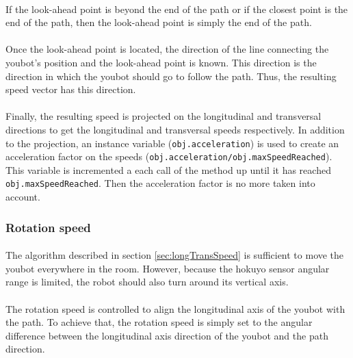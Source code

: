 \documentclass[12pt,a4paper]{article}
\begin{document}
\paragraph{} If the look-ahead point is beyond the end of the path or if the closest point is the end of the path, then the look-ahead point is simply the end of the path.

\paragraph{} Once the look-ahead point is located, the direction of the line connecting the youbot's position and the look-ahead point is known. This direction is the direction in which the youbot should go to follow the path. Thus, the resulting speed vector has this direction.

\paragraph{} Finally, the resulting speed is projected on the longitudinal and transversal directions to get the longitudinal and transversal speeds respectively. In addition to the projection, an instance variable (\texttt{obj.acceleration}) is used to create an acceleration factor on the speeds (\texttt{obj.acceleration/obj.maxSpeedReached}). This variable is incremented a each call of the method up until it has reached \texttt{obj.maxSpeedReached}. Then the acceleration factor is no more taken into account.

\subsubsection{Rotation speed}
\paragraph{} The algorithm described in section \ref{sec:longTransSpeed} is sufficient to move the youbot everywhere in the room. However, because the hokuyo sensor angular range is limited, the robot should also turn around its vertical axis.

\paragraph{} The rotation speed is controlled to align the longitudinal axis of the youbot with the path. To achieve that, the rotation speed is simply set to the angular difference between the longitudinal axis direction of the youbot and the path direction.
\end{document}
